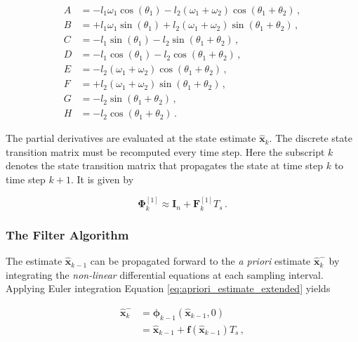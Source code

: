 \begin{equation*}
  \begin{split}
  	A &= -l_1 \omega_1 \cos(\theta_1) -l_2 (\omega_1 + \omega_2) \cos(\theta_1 + \theta_2)\,, \\
  	B &= +l_1 \omega_1 \sin(\theta_1) +l_2 (\omega_1 + \omega_2) \sin(\theta_1 + \theta_2)\,, \\
  	C &= -l_1 \sin(\theta_1) -l_2 \sin (\theta_1 + \theta_2)\,, \\
  	D &= -l_1 \cos(\theta_1) - l_2 \cos (\theta_1 + \theta_2)\,, \\
  	E &= -l_2 (\omega_1 + \omega_2) \cos(\theta_1+ \theta_2)\,, \\
  	F &= +l_2 (\omega_1 + \omega_2) \sin(\theta_1+ \theta_2)\,, \\
    G &= -l_2 \sin (\theta_1 + \theta_2)\,, \\
    H &= -l_2 \cos (\theta_1 + \theta_2)\,.
  \end{split}
\end{equation*}

\noindent
The partial derivatives are evaluated at the state estimate $\hat{\mathbf{x}}_{k}$. The discrete state transition matrix must be recomputed every time step. Here the subscript $k$ denotes the state transition matrix that propagates the state at time step $k$ to time step $k+1$. It is given by 

\begin{equation}
  \bm{\Phi}^{[1]}_{k} \approx \mathbf{I}_{n} + \mathbf{F}^{[1]}_k T_s\,.
\end{equation}

\subsubsection{The Filter Algorithm} 

The estimate $\hat{\mathbf{x}}_{k-1}$ can be propagated forward to the \emph{a priori} estimate $\hat{\mathbf{x}}^{-}_k$ by integrating the \emph{non-linear} differential equations at each sampling interval. Applying Euler integration Equation \ref{eq:apriori_estimate_extended} yields

\begin{equation}\label{eq:apriori_estimate_extended_model}
\begin{split}
	\hat{\mathbf{x}}^{-}_k &= \bm{\phi}_{k-1}(\hat{\mathbf{x}}_{k-1}, 0) \\
	&= \hat{\mathbf{x}}_{k-1} + \mathbf{f}(\hat{\mathbf{x}}_{k-1})T_s\,, 
\end{split} 
\end{equation}

